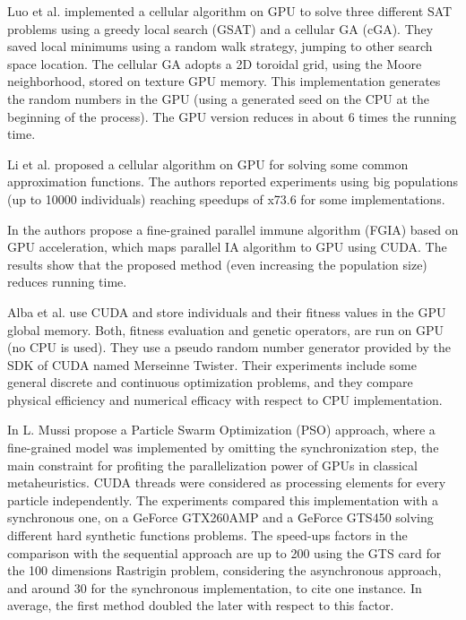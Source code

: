 \documentclass[prodmode,acmtecs]{acmsmall}
\begin{document}
Luo et al. \cite{zhongwen-luo-cellular-2006} implemented a cellular algorithm on GPU to solve three different SAT problems 
using a greedy local search (GSAT) \cite{Selman93domain-independentextensions} and a cellular GA (cGA). 
They saved local minimums using a random walk strategy, jumping to other search space location. 
The cellular GA adopts a 2D toroidal grid, using the Moore neighborhood, stored on texture GPU memory. This implementation generates the random numbers in the GPU (using a generated seed on the CPU at the beginning of the process). 
The GPU version reduces in about 6 times the running time.

Li et al. \cite{jian-ming-li-efficient-2007} proposed a cellular algorithm on GPU for solving some common approximation functions. The authors reported experiments using big populations (up to 10000 individuals) reaching speedups of x73.6 for some implementations. 

In \cite{Li:2009:PIA:1726585.1726930} the authors propose a fine-grained parallel immune algorithm (FGIA) based on GPU acceleration, which maps parallel IA algorithm to GPU using CUDA. The results show that the proposed method (even increasing the population size) reduces running time.%

Alba et al. \cite{springerlink:10.1007978-3-642-12538-619} use CUDA and store individuals and their fitness values in the GPU global memory. Both, fitness evaluation and genetic operators, are run on GPU (no CPU is used). 
They use a pseudo random number generator provided by the SDK of CUDA named Merseinne Twister. Their experiments include some general discrete and continuous optimization problems, and they compare physical efficiency and numerical efficacy with respect to CPU implementation. 

In \cite{PSO-GPU_Mussi} L. Mussi propose a Particle Swarm Optimization (PSO) approach, where a fine-grained model was implemented by omitting the synchronization step, the main constraint for profiting the parallelization power of GPUs in classical metaheuristics. CUDA threads were considered as processing elements for every particle independently. The experiments compared this implementation with a synchronous one, on a GeForce GTX260AMP and a GeForce GTS450 solving different hard synthetic functions problems. The speed-ups factors in the comparison with the sequential approach are up to 200 using the GTS card for the 100 dimensions Rastrigin problem, considering the asynchronous approach, and around 30 for the synchronous implementation, to cite one instance. In average, the first method doubled the later with respect to this factor.
\end{document}

